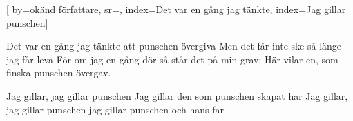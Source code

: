 

[ 		%
	by={okänd författare},					%
	sr={},					%
	index={Det var en gång jag tänkte}, %
	index={Jag gillar punschen}]						%
	

\beginverse*						%
Det var en gång jag tänkte
att punschen övergiva
Men det får inte ske
så länge jag får leva
För om jag en gång dör
så står det på min grav:
Här vilar en, som finska punschen övergav.
\endverse							%

\beginchorus*
Jag gillar, jag gillar punschen
Jag gillar den som punschen skapat har
Jag gillar, jag gillar punschen
jag gillar punschen och hans far
\endchorus


\endsong							%